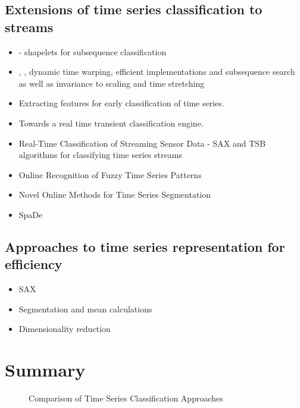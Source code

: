 \documentclass[11pt]{article}
\begin{document}
	\subsection{Extensions of time series classification to streams}
	\begin{itemize}
		\item \citep{ye2009time} - shapelets for subsequence classification
		\item \citep{linfast}, \citep{keogh2001derivative}, \citep{berndt1994using} \citep{capitani2007warping} dynamic time warping, efficient implementations and subsequence search as well as invariance to scaling and time stretching
		\item \citep{xing2011extracting} Extracting features for early classification of time series.
		\item Towards a real time transient classification engine. 
		\item Real-Time Classification of Streaming Sensor Data - SAX and TSB algorithms for classifying time series streams  \citep{kasetty2008real}
		\item Online Recognition of Fuzzy Time Series Patterns \citep{herbst2009online}
		\item Novel Online Methods for Time Series Segmentation 
		\item SpaDe \citep{chen2007spade}
	\end{itemize}
	\subsection{Approaches to time series representation for efficiency}
	\begin{itemize}
		\item SAX \citep{lin2007experiencing}
		\item Segmentation and mean calculations \citep{liu2008novel}
		\item Dimensionality reduction \citep{keogh2001dimensionality}
	\end{itemize}
	
	\section{Summary}
	\begin{figure}
	\caption{Comparison of Time Series Classification Approaches}
	\end{figure}
	
\end{document}
